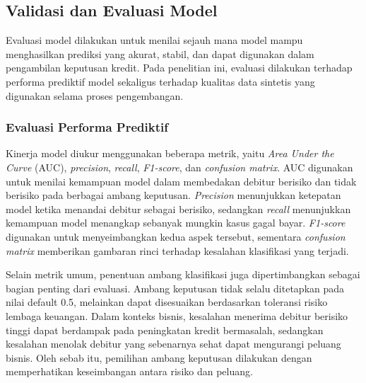 \subsection{Validasi dan Evaluasi Model}
Evaluasi model dilakukan untuk menilai sejauh mana model mampu menghasilkan prediksi yang akurat, stabil, dan dapat digunakan dalam pengambilan keputusan kredit. Pada penelitian ini, evaluasi dilakukan terhadap performa prediktif model sekaligus terhadap kualitas data sintetis yang digunakan selama proses pengembangan.

\subsubsection{Evaluasi Performa Prediktif}
Kinerja model diukur menggunakan beberapa metrik, yaitu \textit{Area Under the Curve} (AUC), \textit{precision}, \textit{recall}, \textit{F1-score}, dan \textit{confusion matrix}. AUC digunakan untuk menilai kemampuan model dalam membedakan debitur berisiko dan tidak berisiko pada berbagai ambang keputusan. \textit{Precision} menunjukkan ketepatan model ketika menandai debitur sebagai berisiko, sedangkan \textit{recall} menunjukkan kemampuan model menangkap sebanyak mungkin kasus gagal bayar. \textit{F1-score} digunakan untuk menyeimbangkan kedua aspek tersebut, sementara \textit{confusion matrix} memberikan gambaran rinci terhadap kesalahan klasifikasi yang terjadi.

Selain metrik umum, penentuan ambang klasifikasi juga dipertimbangkan sebagai bagian penting dari evaluasi. Ambang keputusan tidak selalu ditetapkan pada nilai default 0.5, melainkan dapat disesuaikan berdasarkan toleransi risiko lembaga keuangan. Dalam konteks bisnis, kesalahan menerima debitur berisiko tinggi dapat berdampak pada peningkatan kredit bermasalah, sedangkan kesalahan menolak debitur yang sebenarnya sehat dapat mengurangi peluang bisnis. Oleh sebab itu, pemilihan ambang keputusan dilakukan dengan memperhatikan keseimbangan antara risiko dan peluang.

